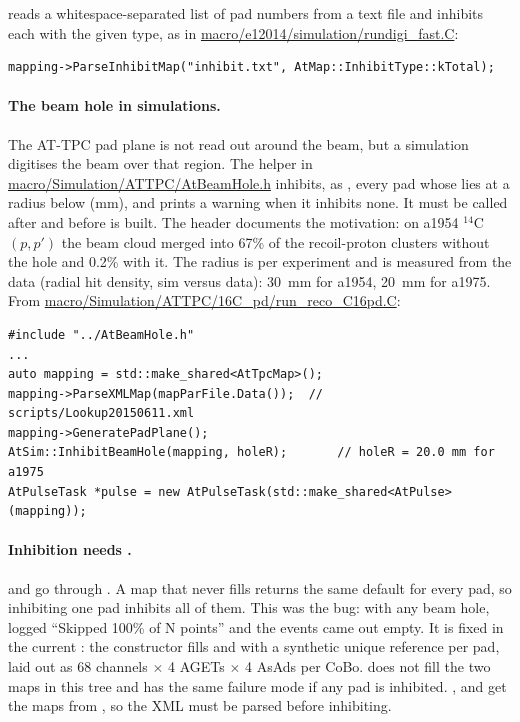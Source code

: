  reads a whitespace-separated list of pad numbers from a text file
and inhibits each with the given type, as in \url{macro/e12014/simulation/rundigi_fast.C}:
\begin{verbatim}
mapping->ParseInhibitMap("inhibit.txt", AtMap::InhibitType::kTotal);
\end{verbatim}

\paragraph{The beam hole in simulations.} The AT-TPC pad plane is not read out around the beam, but a
simulation digitises the beam over that region. The helper  in
\url{macro/Simulation/ATTPC/AtBeamHole.h} inhibits, as , every pad whose
 lies at a radius below  (mm), and prints a warning when it inhibits
none. It must be called after  and before  is built. The
header documents the motivation: on a1954 $^{14}$C$(p,p')$ the beam cloud merged into 67\% of the
recoil-proton clusters without the hole and 0.2\% with it. The radius is per experiment and is
measured from the data (radial hit density, sim versus data): 30~mm for a1954, 20~mm for a1975. From
\url{macro/Simulation/ATTPC/16C_pd/run_reco_C16pd.C}:
\begin{verbatim}
#include "../AtBeamHole.h"
...
auto mapping = std::make_shared<AtTpcMap>();
mapping->ParseXMLMap(mapParFile.Data());  // scripts/Lookup20150611.xml
mapping->GeneratePadPlane();
AtSim::InhibitBeamHole(mapping, holeR);       // holeR = 20.0 mm for a1975
AtPulseTask *pulse = new AtPulseTask(std::make_shared<AtPulse>(mapping));
\end{verbatim}

\paragraph{Inhibition needs .}  and 
go through . A map that never fills  returns the same
default  for every pad, so inhibiting one pad inhibits all of them. This was the
 bug: with any beam hole,  logged ``Skipped 100\% of N points'' and
the events came out empty. It is fixed in the current : the constructor
fills  and  with a synthetic unique reference per pad, laid out as
68 channels $\times$ 4 AGETs $\times$ 4 AsAds per CoBo.  does not fill the two maps
in this tree and has the same failure mode if any pad is inhibited. ,
 and  get the maps from , so the XML must be
parsed before inhibiting.

